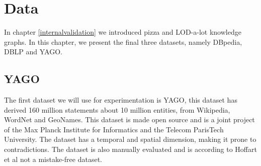 \documentclass[11pt,letterpaper ,oneside ]{book}
\begin{document}
	\section{Data}
	
	In chapter \ref{internalvalidation} we introduced pizza and LOD-a-lot knowledge graphs. In this chapter, we present the final three datasets, namely DBpedia, DBLP and YAGO.
	
	\subsection{YAGO}
	The first dataset we will use for experimentation is YAGO\cite{YAGO2:2013}, this dataset has derived 160 million statements about 10 million entities, from Wikipedia, WordNet and GeoNames. This dataset is made open source and is a joint project of the Max Planck Institute for Informatics and the Telecom ParisTech University. The dataset has a temporal and spatial dimension, making it prone to contradictions. The dataset is also manually evaluated and is according to Hoffart et al\cite{YAGO2:2013} not a mistake-free dataset.
	
\end{document}
